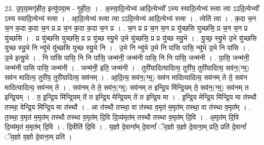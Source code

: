 \documentclass[17pt]{extarticle}
\begin{document}
23. उ॒प॒या॒मगृ॑हीत॒ इत्यु॑पया॒म - गृ॒ही॒तः॒ । . अ॒स्या॒दि॒त्येभ्य॑ आदि॒त्येभ्यो᳚ ऽस्य स्यादि॒त्येभ्य॑ स्त्वा त्वा ऽऽदि॒त्येभ्यो᳚ ऽस्य स्यादि॒त्येभ्य॑ स्त्वा । . आ॒दि॒त्येभ्य॑ स्त्वा त्वा ऽऽदि॒त्येभ्य॑ आदि॒त्येभ्य॑ स्त्वा । . त्वेति॑ त्वा । . क॒दा च॒न च॒न क॒दा क॒दा च॒न प्र प्र च॒न क॒दा क॒दा च॒न प्र । . च॒न प्र प्र च॒न च॒न प्र यु॑च्छसि युच्छसि॒ प्र च॒न च॒न प्र यु॑च्छसि । . प्र यु॑च्छसि युच्छसि॒ प्र प्र यु॑च्छ स्यु॒भे उ॒भे यु॑च्छसि॒ प्र प्र यु॑च्छ स्यु॒भे । . यु॒च्छ॒ स्यु॒भे उ॒भे यु॑च्छसि युच्छ स्यु॒भे नि न्यु॑भे यु॑च्छसि युच्छ स्यु॒भे नि । . उ॒भे नि न्यु॑भे उ॒भे नि पा॑सि पासि॒ न्यु॑भे उ॒भे नि पा॑सि । . उ॒भे इत्यु॒भे । . नि पा॑सि पासि॒ नि नि पा॑सि॒ जन्म॑नी॒ जन्म॑नी पासि॒ नि नि पा॑सि॒ जन्म॑नी । . पा॒सि॒ जन्म॑नी॒ जन्म॑नी पासि पासि॒ जन्म॑नी । . जन्म॑नी॒ इति॒ जन्म॑नी । . तुरी॑यादित्यादित्य॒ तुरी॑य॒ तुरी॑यादित्य॒ सव॑न॒(ग्म्॒) सव॑न मादित्य॒ तुरी॑य॒ तुरी॑यादित्य॒ सव॑नम् । . आ॒दि॒त्य॒ सव॑न॒(ग्म्॒) सव॑न मादित्यादित्य॒ सव॑नम् ते ते॒ सव॑न मादित्यादित्य॒ सव॑नम् ते । . सव॑नम् ते ते॒ सव॑न॒(ग्म्॒) सव॑नम् त इन्द्रि॒य मि॑न्द्रि॒यम् ते॒ सव॑न॒(ग्म्॒) सव॑नम् त इन्द्रि॒यम् । . त॒ इ॒न्द्रि॒य मि॑न्द्रि॒यम् ते॑ त इन्द्रि॒य मेन्द्रि॒यम् ते॑ त इन्द्रि॒य मा । . इ॒न्द्रि॒य मेन्द्रि॒य मि॑न्द्रि॒य मा त॑स्थौ तस्था॒ वेन्द्रि॒य मि॑न्द्रि॒य मा त॑स्थौ । . आ त॑स्थौ तस्था॒ वा त॑स्था व॒मृत॑ म॒मृत॑म् तस्था॒ वा त॑स्था व॒मृत᳚म् । . त॒स्था॒ व॒मृत॑ म॒मृत॑म् तस्थौ तस्था व॒मृत॑म् दि॒वि दि॒व्य॑मृत॑म् तस्थौ तस्था व॒मृत॑म् दि॒वि । . अ॒मृत॑म् दि॒वि दि॒व्य॑मृत॑ म॒मृत॑म् दि॒वि । . दि॒वीति॑ दि॒वि । . य॒ज्ञो दे॒वाना᳚म् दे॒वानां᳚ ॅय॒ज्ञो य॒ज्ञो दे॒वाना॒म् प्रति॒ प्रति॑ दे॒वानां᳚ ॅय॒ज्ञो य॒ज्ञो दे॒वाना॒म् प्रति॑ । \newline
\end{document}
